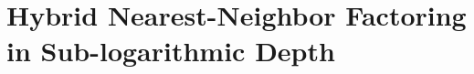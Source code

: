 \chapter{Hybrid Nearest-Neighbor Factoring in Sub-logarithmic Depth}
\label{chap:factor-sublog}









%


